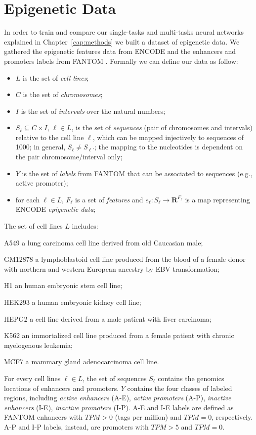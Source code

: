 \section{Epigenetic Data} \label{sec:epigenomic_data}
In order to train and compare our single-tasks and multi-tasks neural networks explained in Chapter~\ref{cap:methods} we built a dataset of epigenetic data. We gathered the epigenetic features data from
ENCODE \cite{ENCODE_data} and the enhancers and promoters labels from
FANTOM \cite{FANTOM_data}. Formally we can define our data as follow: 
\begin{itemize}
    \item $L$ is the set of \emph{cell lines};
    \item $C$ is the set of \emph{chromosomes};
    \item $I$ is the set of \emph{intervals} over the natural numbers;
    \item $S_\ell\subseteq C\times I$, $\ell\in L$, is the set of \emph{sequences} (pair of chromosomes and intervals) relative to the cell line $\ell$, which can be mapped injectively to sequences of 1000; in general, $S_\ell\neq S_{\ell'}$; the mapping to the nucleotides is dependent on the pair chromosome/interval only;
    \item $Y$ is the set of \emph{labels} from FANTOM that can be associated to sequences (e.g., active promoter);
    \item for each $\ell\in L$, $F_\ell$ is a set of \emph{features} and $e_\ell:S_\ell\to\mathbf R^{F_\ell}$ is a map representing ENCODE \emph{epigenetic data};
\end{itemize}
The set of cell lines $L$ includes: 
\begin{description} 
\item A549 a lung carcinoma cell line derived from old Caucasian male;
\item GM12878 a lymphoblastoid cell line produced from the blood of a female donor with northern and western European ancestry by EBV transformation;
\item H1 an human embryonic stem cell line; 
\item HEK293 a human embryonic kidney cell line;
\item HEPG2 a cell line derived from a male patient with liver carcinoma;
\item K562 an immortalized cell line produced from a female patient with chronic myelogenous leukemia;
\item MCF7 a mammary gland adenocarcinoma cell line.
\end{description}
For every cell lines $\ell \in L$, the set of sequences $S_\ell$ contains the genomics locations of enhancers and promoters. $Y$ contains the four classes of labeled regions, including \emph{active enhancers} (A-E), \emph{active promoters} (A-P), \emph{inactive enhancers} (I-E), \emph{inactive promoters} (I-P). A-E and I-E labels are defined as FANTOM enhancers with $TPM>0$ (tags per million) and $TPM=0$, respectively. A-P and I-P labels, instead, are promoters with $TPM>5$ and $TPM=0$. 

